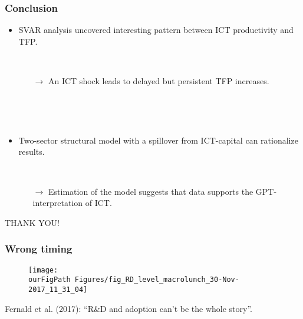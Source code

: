 \documentclass{beamer}
\def \ourFigPath {../../}
\begin{document}
\begin{frame}
	\frametitle{Conclusion}

\begin{itemize}
\item SVAR analysis uncovered interesting pattern between ICT productivity and TFP.

\

	\begin{itemize}
	\item[$\rightarrow$] An ICT shock leads to delayed but persistent TFP increases.
	\end{itemize}

\

\

\item Two-sector structural model with a spillover from ICT-capital can rationalize results.

\

	\begin{itemize}
	\item[$\rightarrow$] Estimation of the model suggests that data supports the GPT-interpretation of ICT.
	\end{itemize}
\end{itemize}

	

\end{frame}

\begin{frame}
\centering
	THANK YOU!
	

\end{frame}


\begin{frame}
	\frametitle{Wrong timing}
	\label{wrong_timing}
	
		\vspace{-1cm}
	\noindent
	\begin{figure}
		\centering
		\texttt{[image: \\ourFigPath Figures/fig\_RD\_level\_macrolunch\_30-Nov-2017\_11\_31\_04]}
	\end{figure}
	
	Fernald et al. (2017): ``R\&D and adoption can't be the whole story''.
	

\end{frame}
\end{document}
